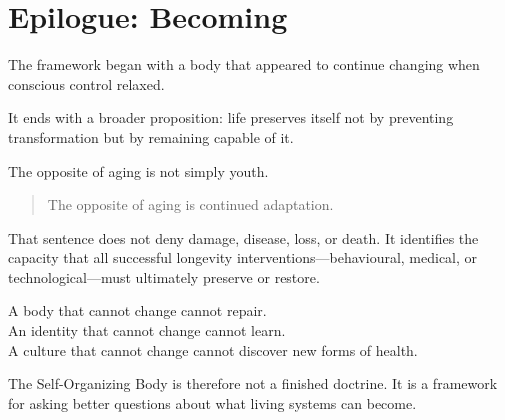 \chapter{Epilogue: Becoming}

The framework began with a body that appeared to continue changing when conscious control relaxed.

It ends with a broader proposition: life preserves itself not by preventing transformation but by remaining capable of it.

The opposite of aging is not simply youth.

\begin{quote}
The opposite of aging is continued adaptation.
\end{quote}

That sentence does not deny damage, disease, loss, or death. It identifies the capacity that all successful longevity interventions---behavioural, medical, or technological---must ultimately preserve or restore.

A body that cannot change cannot repair.\\
An identity that cannot change cannot learn.\\
A culture that cannot change cannot discover new forms of health.

The Self-Organizing Body is therefore not a finished doctrine. It is a framework for asking better questions about what living systems can become.
